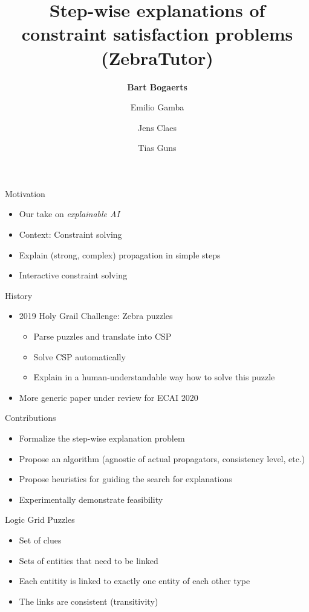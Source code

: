 \documentclass[12pt]{beamer}
\title{Step-wise explanations of constraint satisfaction problems (ZebraTutor)}
\author{{\bf Bart Bogaerts} \and Emilio Gamba \and Jens Claes \and Tias Guns}
\begin{document}
\frame{\maketitle} %

\begin{frame}{Motivation}
\begin{itemize}
 \item Our take on \emph{explainable AI}
 \item Context: Constraint solving
 \item Explain (strong, complex) propagation in simple steps
 \item Interactive constraint solving
\end{itemize}

\end{frame}

\begin{frame}{History}
\begin{itemize}
 \item 2019 Holy Grail Challenge: Zebra puzzles
 \begin{itemize}
    \item Parse puzzles and translate into CSP
    \item Solve CSP automatically
    \item Explain in a human-understandable way how to solve this puzzle
 \end{itemize}
 \item More generic paper under review for ECAI 2020
\end{itemize}

 
\end{frame}


\begin{frame}{Contributions}
\begin{itemize}
 \item Formalize the step-wise explanation problem
 \item Propose an algorithm (agnostic of actual propagators, consistency level, etc.)
 \item Propose heuristics for guiding the search for explanations
 \item Experimentally demonstrate feasibility
\end{itemize}
 
\end{frame}


\begin{frame}{Logic Grid Puzzles}
 \begin{itemize}
  \item Set of clues
  \item Sets of entities that need to be linked
  \item Each entitity is linked to exactly one entity of each other type
  \item The links are consistent (transitivity)
 \end{itemize}

\end{frame}
\end{document}
